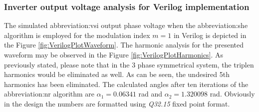 \documentclass[a4paper, twoside, 11pt]{article}
\begin{document}
        
    \FloatBarrier

    \subsubsection{Inverter output voltage analysis for Verilog implementation}
        The simulated \gls{abbreviation:vsi} output phase voltage when the \gls{abbreviation:she} algorithm is employed for the modulation index $m = 1$ in Verilog is depicted in the Figure \ref{fig:VerilogPlotWaveform}. The harmonic analysis for the presented waveform may be observed in the Figure \ref{fig:VerilogPlotHarmonics}. As previously stated, please note that in the 3 phase symmetrical system, the triplen harmonics would be eliminated as well. As can be seen, the undesired 5th harmonics has been eliminated. The calculated angles after ten iterations of the \gls{abbreviation:nr} algorithm are $\alpha_1 = 0.06341$ rad and $\alpha_2 = 1.320098$ rad. Obviously in the design the numbers are formatted using \textit{Q32.15} fixed point format.
\end{document}
